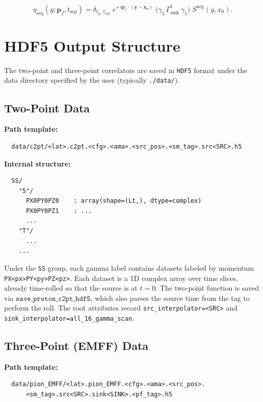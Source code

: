 \documentclass[11pt,a4paper]{article}
\newcommand{\gfive}{\gamma_5}
\newcommand{\gsink}{\Gamma_{\text{sink}}}
\newcommand{\etaseq}{\eta_{\text{seq}}}
\newcommand{\hdfcmd}{\texttt{HDF5}}
\begin{document}
\begin{equation}
\etaseq(y; \mathbf{p}_f, t_{\text{sep}})
  = \delta_{t_y,\,t_{\text{sep}}} \;
    e^{+i\mathbf{p}_f\cdot(\mathbf{y}-\mathbf{x}_0)} \;
    \big(\gfive \, \gsink^\dagger \, \gfive\big) \;
    S^{\text{neg}}(y, x_0) .
\label{eq:etaseq_full}
\end{equation}


\section{HDF5 Output Structure}

The two-point and three-point correlators are saved in \hdfcmd{} format under the
data directory specified by the user (typically \texttt{./data/}).

\subsection{Two-Point Data}

\textbf{Path template:}
\begin{verbatim}
  data/c2pt/<lat>.c2pt.<cfg>.<ama>.<src_pos>.<sm_tag>.src<SRC>.h5
\end{verbatim}

\textbf{Internal structure:}
\begin{verbatim}
  SS/
    "5"/
      PX0PY0PZ0    : array(shape=(Lt,), dtype=complex)
      PX0PY0PZ1    : ...
      ...
    "T"/
      ...
    ...
\end{verbatim}

Under the \texttt{SS} group, each gamma label contains datasets labeled by
momentum \texttt{PX<px>PY<py>PZ<pz>}.  Each dataset is a 1D complex array over
time slices, already time-rolled so that the source is at \(t=0\).  The two-point
function is saved via \(\texttt{save\_proton\_c2pt\_hdf5}\), which also parses
the source time from the tag to perform the roll.
The root attributes record \texttt{src\_interpolator=<SRC>} and
\texttt{sink\_interpolator=all\_16\_gamma\_scan}.

\subsection{Three-Point (EMFF) Data}

\textbf{Path template:}
\begin{verbatim}
  data/pion_EMFF/<lat>.pion_EMFF.<cfg>.<ama>.<src_pos>.
      <sm_tag>.src<SRC>.sink<SINK>.<pf_tag>.h5
\end{verbatim}
\end{document}
